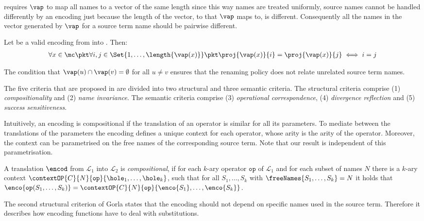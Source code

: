 \documentclass[]{article}
\begin{document}
\cite{gorla} requires $ \vap $ to map all names to a vector of the same length since this way names are treated uniformly, \ie source names cannot be handled differently by an encoding just because the length of the vector, to that $ \vap $ maps to, is different.
Consequently all the names in the vector generated by $ \vap $ for a source term name should be pairwise different.

\begin{obs}
	\label{obs:renamingPolicyVector}
	Let \encod be a valid encoding from \piT into \piNM. Then:
	\begin{align*}
		\forall x \in \mc \pkt \forall i, j \in \Set{ 1, \ldots, \length{\vap\!\left( x \right)} } \pkt \proj{\vap\!\left( x \right)}{i} = \proj{\vap\!\left( x \right)}{j} \iff i = j
	\end{align*}
\end{obs}

The condition that $\vap(u) \cap \vap(v) = \emptyset$ for all $u \neq v$ ensures that the renaming policy does not relate unrelated source term names.

The five criteria that are proposed in \cite{gorla} are divided into two structural and three semantic criteria. The structural criteria comprise (1) \emph{compositionality} and (2) \emph{name invariance}. The semantic criteria comprise (3) \emph{operational correspondence}, (4) \emph{divergence reflection} and (5) \emph{success sensitiveness}.

Intuitively, an encoding is compositional if the translation of an operator is similar for all its parameters. To mediate between the translations of the parameters the encoding defines a unique context for each operator, whose arity is the arity of the operator. Moreover, the context can be parametrised on the free names of the corresponding source term. Note that our result is independent of this parametrisation.

\bkrit[Compositionality]
	\label{comp}
	A translation $\encod$ from $\mathcal{L}_1$ into $\mathcal{L}_2$ is \emph{compositional}, if for each $k$-ary operator $\mathtt{op}$ of $\mathcal{L}_1$ and for each subset of names $N$ there is a $k$-ary context $ \contextOP{C}{N}{\mathtt{op}}{\hole_1, \dots, \hole_k} $, such that for all $S_1, \dots, S_k$ with $\freeNames{S_1, \dots, S_k} = N$ it holds that $ \enco{\mathtt{op}(S_1, \dots, S_k)} = \contextOP{C}{N}{\mathtt{op}}{\enco{S_1}, \ldots, \enco{S_k}} $.
\ekrit

The second structural criterion of Gorla states that the encoding should not depend on specific names used in the source term. Therefore it describes how encoding functions have to deal with substitutions.
\end{document}
